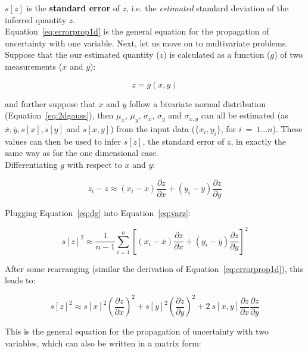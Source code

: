 $s[z]$ is the \textbf{standard error} of $z$, i.e.  the
\textit{estimated} standard deviation of the inferred quantity $z$.\\

Equation~\ref{eq:errorprop1d} is the general equation for the
propagation of uncertainty with one variable.  Next, let us move on to
multivariate problems. Suppose that the our estimated quantity ($z$)
is calculated as a function ($g$) of two measurements ($x$ and $y$):

\begin{equation}
z = g(x,y)
\label{eq:zfxy}
\end{equation}

and further suppose that $x$ and $y$ follow a bivariate normal
distribution (Equation~\ref{eq:2dgauss}), then $\mu_x$, $\mu_{y}$,
$\sigma_{x}$, $\sigma_{y}$ and $\sigma_{x,y}$ can all be estimated (as
$\bar{x}, \bar{y}, s[x], s[y]$ and $s[x,y]$) from the input data
($\{x_i, y_i\}$, for $i~=~1...n$). These values can then be used to
infer $s[z]$, the standard error of $z$, in exactly the same way as
for the one dimensional case.\\

Differentiating $g$ with respect to $x$ and $y$:

\begin{equation}
  z_i - \overline{z} \approx (x_i-\overline{x}) \frac{\partial z}{\partial x} +
  (y_i-\overline{y}) \frac{\partial z}{\partial y}
  \label{eq:dg}
\end{equation}

Plugging Equation~\ref{eq:dg} into Equation~\ref{eq:varz}:

\begin{equation}
  s[z]^2 \approx \frac{1}{n-1} \sum_{i=1}^{n} \left[
    (x_i-\overline{x}) \frac{\partial z}{\partial x} +
    (y_i-\overline{y}) \frac{\partial z}{\partial y} \right]^2
\end{equation}

After some rearranging (similar the derivation of
Equation~\ref{eq:errorprop1d}), this leads to:

\begin{equation}
  s[z]^2 \approx s[x]^2 \left(\frac{\partial z}{\partial x}\right)^2 +
  s[y]^2 \left(\frac{\partial z}{\partial y}\right)^2 +
  2~s[x,y] \frac{\partial z}{\partial x} \frac{\partial z}{\partial y}
  \label{eq:errorprop2d}
\end{equation}

This is the general equation for the propagation of uncertainty with
two variables, which can also be written in a matrix form:

